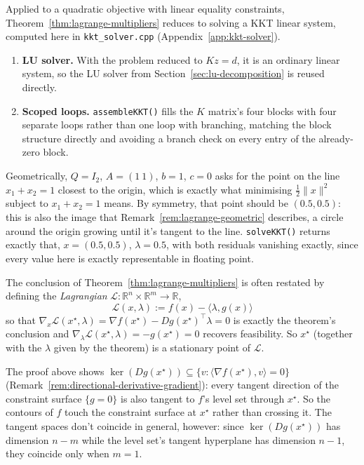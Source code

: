 	\begin{compremark}
		Applied to a quadratic objective with linear equality constraints, Theorem~\ref{thm:lagrange-multipliers} reduces to solving a KKT linear system, computed here in \texttt{kkt\_solver.cpp} (Appendix~\ref{app:kkt-solver}).
		
		\begin{enumerate}[label=\roman*.]
			\item \textbf{LU solver.} With the problem reduced to $Kz=d$, it is an ordinary linear system, so the LU solver from Section~\ref{sec:lu-decomposition} is reused directly.
			\item \textbf{Scoped loops.} \texttt{assembleKKT()} fills the $K$ matrix's four blocks with four separate loops rather than one loop with branching, matching the block structure directly and avoiding a branch check on every entry of the already-zero block.
		\end{enumerate}
		
		Geometrically, $Q=I_2$, $A=(1\ 1)$, $b=1$, $c=0$ asks for the point on the line $x_1+x_2=1$ closest to the origin, which is exactly what minimising $\tfrac12\|x\|^2$ subject to $x_1 + x_2=1$ means. By symmetry, that point should be $(0.5, 0.5)$: this is also the image that Remark~\ref{rem:lagrange-geometric} describes, a circle around the origin growing until it's tangent to the line. \texttt{solveKKT()} returns exactly that, $x = (0.5, 0.5)$, $\lambda = 0.5$, with both residuals vanishing exactly, since every value here is exactly representable in floating point.
	\end{compremark}

	\begin{remark}
		\label{rem:lagrangian}
		The conclusion of Theorem~\ref{thm:lagrange-multipliers} is often restated by defining the \textit{Lagrangian} $\mathcal{L}: \mathbb{R}^n \times \mathbb{R}^m \to \mathbb{R}$,
		\[
			\mathcal{L}(x,\lambda) := f(x) - \langle \lambda, g(x)\rangle
		\]
		so that $\nabla_x\mathcal{L}(x^\star,\lambda) = \nabla f(x^\star) - Dg(x^\star)^\top\lambda = 0$ is exactly the theorem's conclusion and $\nabla_\lambda\mathcal{L}(x^\star,\lambda) = -g(x^\star) = 0$ recovers feasibility. So $x^\star$ (together with the $\lambda$ given by the theorem) is a stationary point of $\mathcal{L}$.
	\end{remark}
	
	\begin{remark}
		\label{rem:lagrange-geometric}
		The proof above shows $\ker(Dg(x^\star))\subseteq\{v:\langle\nabla f(x^\star),v\rangle=0\}$ (Remark~\ref{rem:directional-derivative-gradient}): every tangent direction of the constraint surface $\{g=0\}$ is also tangent to $f$'s level set through $x^\star$. So the contours of $f$ touch the constraint surface at $x^\star$ rather than crossing it. The tangent spaces don't coincide in general, however: since $\ker(Dg(x^\star))$ has dimension $n-m$ while the level set's tangent hyperplane has dimension $n-1$, they coincide only when $m=1$.
	\end{remark}
	
